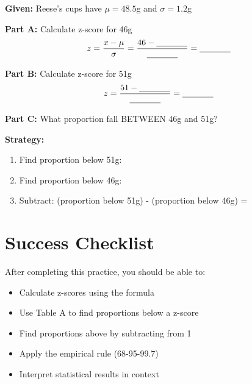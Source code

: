 \documentclass[11pt]{article}
\begin{document}
\textbf{Given:} Reese's cups have $\mu = 48.5$g and $\sigma = 1.2$g

\textbf{Part A:} Calculate z-score for 46g
\[
z = \frac{x - \mu}{\sigma} = \frac{46 - \underline{\hspace{0.5in}}}{\underline{\hspace{0.5in}}} = \underline{\hspace{0.5in}}
\]

\vspace{0.5in}

\textbf{Part B:} Calculate z-score for 51g
\[
z = \frac{51 - \underline{\hspace{0.5in}}}{\underline{\hspace{0.5in}}} = \underline{\hspace{0.5in}}
\]

\vspace{0.5in}

\textbf{Part C:} What proportion fall BETWEEN 46g and 51g?

\textbf{Strategy:}
\begin{enumerate}
    \item Find proportion below 51g: \underline{\hspace{1in}}
    \item Find proportion below 46g: \underline{\hspace{1in}}
    \item Subtract: (proportion below 51g) - (proportion below 46g) = \underline{\hspace{1in}}
\end{enumerate}

\vspace{0.5in}

\newpage

\section*{Success Checklist}

After completing this practice, you should be able to:

\begin{itemize}[label=$\square$]
    \item Calculate z-scores using the formula
    \item Use Table A to find proportions below a z-score
    \item Find proportions above by subtracting from 1
    \item Apply the empirical rule (68-95-99.7)
    \item Interpret statistical results in context
\end{itemize}
\end{document}
